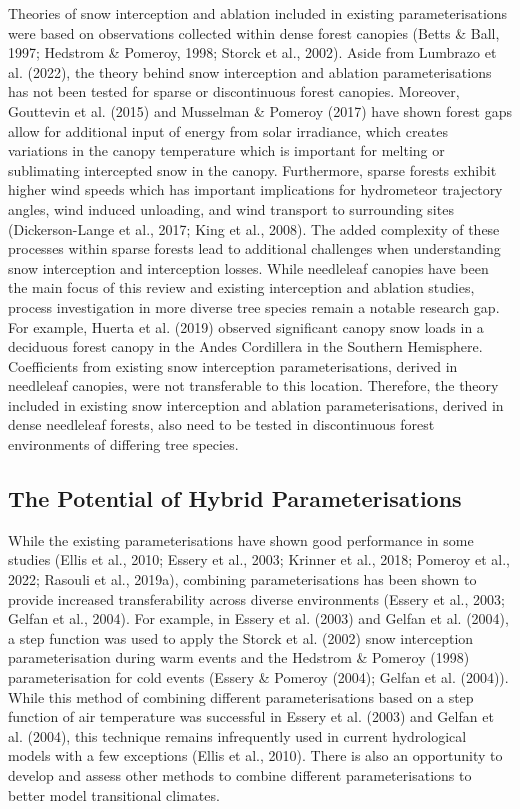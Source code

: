 \documentclass[
  letterpaper,
]{tex/uofsthesis-cs}
\begin{document}
Theories of snow interception and ablation included in existing
parameterisations were based on observations collected within dense
forest canopies (Betts \& Ball, 1997; Hedstrom \& Pomeroy, 1998; Storck
et al., 2002). Aside from Lumbrazo et al. (2022), the theory behind snow
interception and ablation parameterisations has not been tested for
sparse or discontinuous forest canopies. Moreover, Gouttevin et al.
(2015) and Musselman \& Pomeroy (2017) have shown forest gaps allow for
additional input of energy from solar irradiance, which creates
variations in the canopy temperature which is important for melting or
sublimating intercepted snow in the canopy. Furthermore, sparse forests
exhibit higher wind speeds which has important implications for
hydrometeor trajectory angles, wind induced unloading, and wind
transport to surrounding sites (Dickerson-Lange et al., 2017; King et
al., 2008). The added complexity of these processes within sparse
forests lead to additional challenges when understanding snow
interception and interception losses. While needleleaf canopies have
been the main focus of this review and existing interception and
ablation studies, process investigation in more diverse tree species
remain a notable research gap. For example, Huerta et al. (2019)
observed significant canopy snow loads in a deciduous forest canopy in
the Andes Cordillera in the Southern Hemisphere. Coefficients from
existing snow interception parameterisations, derived in needleleaf
canopies, were not transferable to this location. Therefore, the theory
included in existing snow interception and ablation parameterisations,
derived in dense needleleaf forests, also need to be tested in
discontinuous forest environments of differing tree species.

\subsection{The Potential of Hybrid
Parameterisations}\label{the-potential-of-hybrid-parameterisations}

While the existing parameterisations have shown good performance in some
studies (Ellis et al., 2010; Essery et al., 2003; Krinner et al., 2018;
Pomeroy et al., 2022; Rasouli et al., 2019a), combining
parameterisations has been shown to provide increased transferability
across diverse environments (Essery et al., 2003; Gelfan et al., 2004).
For example, in Essery et al. (2003) and Gelfan et al. (2004), a step
function was used to apply the Storck et al. (2002) snow interception
parameterisation during warm events and the Hedstrom \& Pomeroy (1998)
parameterisation for cold events (Essery \& Pomeroy (2004); Gelfan et
al. (2004)). While this method of combining different parameterisations
based on a step function of air temperature was successful in Essery et
al. (2003) and Gelfan et al. (2004), this technique remains infrequently
used in current hydrological models with a few exceptions (Ellis et al.,
2010). There is also an opportunity to develop and assess other methods
to combine different parameterisations to better model transitional
climates.
\end{document}

